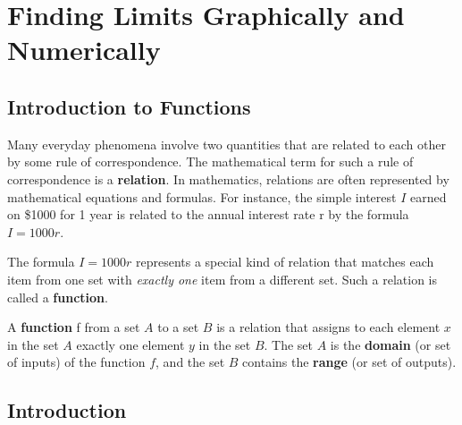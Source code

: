 \chapter{Finding Limits Graphically and Numerically}

\section{Introduction to Functions}

Many everyday phenomena involve two quantities that are related to 
each other by some rule of correspondence. The mathematical term for 
such a rule of correspondence is a \textbf{relation}. In mathematics, 
relations are often represented by mathematical equations and formulas. 
For instance, the simple interest $I$ earned on \$1000 for 1 year is 
related to the annual interest rate r by the formula $I = 1000r$.

The formula $I = 1000r$ represents a special kind of relation that 
matches each item from one set with \textit{exactly one} item from a 
different set. Such a relation is called a \textbf{function}.

\begin{definition}[Function]
	A \textbf{function} f from a set $A$ to a set $B$ is a relation that 
	assigns to each element $x$ in the set $A$ exactly one element $y$ 
	in the set $B$. The set $A$ is the \textbf{domain} (or set of inputs) 
	of the function $f$, and the set $B$ contains the \textbf{range} 
	(or set of outputs).
\end{definition}

\section{Introduction}
\lipsum[1]